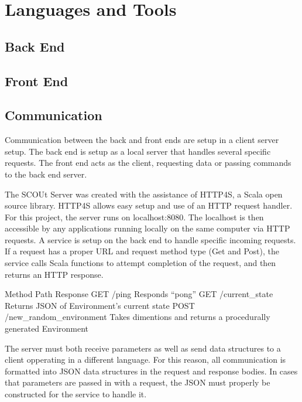

\chapter{Languages and Tools}

\section{Back End}


\section{Front End}


\section{Communication}
Communication between the back and front ends are setup in a client server setup.
The back end is setup as a local server that handles several specific requests.
The front end acts as the client, requesting data or passing commands to the back end server.

The SCOUt Server was created with the assistance of HTTP4S, a Scala open source library. 
HTTP4S allows easy setup and use of an HTTP request handler.
For this project, the server runs on localhost:8080.
The localhost is then accessible by any applications running locally on the same computer via HTTP requests.
A service is setup on the back end to handle specific incoming requests.
If a request has a proper URL and request method type (Get and Post), the service calls Scala functions to attempt completion of the request, and then returns an HTTP response.

Method	Path	Response
GET	/ping	Responds “pong”
GET	/current_state	Returns JSON of Environment’s current state
POST	/new_random_environment	Takes dimentions and returns a procedurally generated Environment

The server must both receive parameters as well as send data structures to a client opperating in a different language.
For this reason, all communication is formatted into JSON data structures in the request and response bodies.
In cases that parameters are passed in with a request, the JSON must properly be constructed for the service to handle it.
